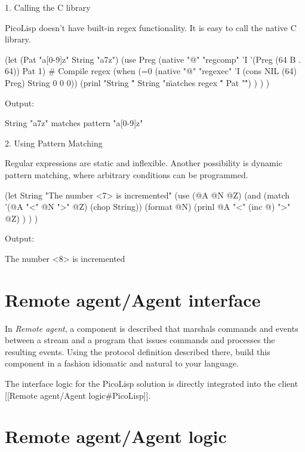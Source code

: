\begin{wideverbatim}

1. Calling the C library

PicoLisp doesn't have built-in regex functionality.
It is easy to call the native C library.

(let (Pat "a[0-9]z"  String "a7z")
   (use Preg
      (native "@" "regcomp" 'I '(Preg (64 B . 64)) Pat 1)  # Compile regex
      (when (=0 (native "@" "regexec" 'I (cons NIL (64) Preg) String 0 0 0))
         (prinl "String \"" String "\" matches regex \"" Pat "\"") ) ) )

Output:

String "a7z" matches pattern "a[0-9]z"

2. Using Pattern Matching

Regular expressions are static and inflexible. Another possibility is
dynamic pattern matching, where arbitrary conditions can be programmed.

(let String "The number <7> is incremented"
   (use (@A @N @Z)
      (and
         (match '(@A "<" @N ">"  @Z) (chop String))
         (format @N)
         (prinl @A "<" (inc @) ">" @Z) ) ) )

Output:

The number <8> is incremented

\end{wideverbatim}

\pagebreak{}
\section*{Remote agent/Agent interface}

In \emph{Remote agent}, a component is described that marshals
commands and events between a stream and a program that issues
commands and processes the resulting events. Using the protocol
definition described there, build this component in a fashion
idiomatic and natural to your language.

\begin{wideverbatim}

The interface logic for the PicoLisp solution is directly integrated into
the client [[Remote agent/Agent logic#PicoLisp]].

\end{wideverbatim}

\pagebreak{}
\section*{Remote agent/Agent logic}

